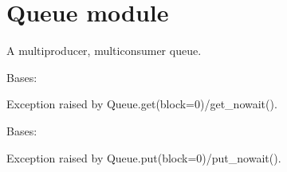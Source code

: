 \documentclass[letterpaper,10pt,english]{sphinxmanual}
\begin{document}
\sphinxstepscope


\section{Queue module}
\label{\detokenize{queue:module-queue}}\label{\detokenize{queue:queue-module}}\label{\detokenize{queue::doc}}
\sphinxAtStartPar
A multi\sphinxhyphen{}producer, multi\sphinxhyphen{}consumer queue.

\begin{fulllineitems}
\label{\detokenize{queue:queue.Empty}}
\pysigstartsignatures
{}
\pysigstopsignatures
\sphinxAtStartPar
Bases: 

\sphinxAtStartPar
Exception raised by Queue.get(block=0)/get\_nowait().

\end{fulllineitems}


\begin{fulllineitems}
\label{\detokenize{queue:queue.Full}}
\pysigstartsignatures
{}
\pysigstopsignatures
\sphinxAtStartPar
Bases: 

\sphinxAtStartPar
Exception raised by Queue.put(block=0)/put\_nowait().

\end{fulllineitems}

\end{document}
